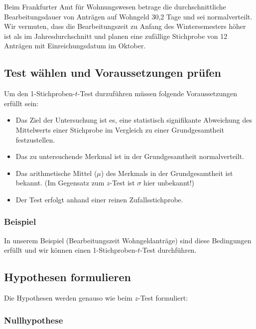 \documentclass[
  11pt,
  ngerman,
  a4paper,
]{report}
\providecommand{\tightlist}{%
  \setlength{\itemsep}{0pt}\setlength{\parskip}{0pt}}
\begin{document}
Beim Frankfurter Amt für Wohnungswesen betrage die durchschnittliche Bearbeitungsdauer von Anträgen auf Wohngeld 30,2 Tage und sei normalverteilt. Wir vermuten, dass die Bearbeitungszeit zu Anfang des Wintersemesters höher ist als im Jahresdurchschnitt und planen eine zufällige Stichprobe von 12 Anträgen mit Einreichungsdatum im Oktober.

\hypertarget{test-wuxe4hlen-und-voraussetzungen-pruxfcfen-1}{%
\subsection{Test wählen und Voraussetzungen prüfen}\label{test-wuxe4hlen-und-voraussetzungen-pruxfcfen-1}}

Um den 1-Stichproben-\(t\)-Test durzuführen müssen folgende Voraussetzungen erfüllt sein:

\begin{itemize}
\tightlist
\item
  Das Ziel der Untersuchung ist es, eine statistisch signifikante Abweichung des Mittelwerts einer Stichprobe im Vergleich zu einer Grundgesamtheit festzustellen.
\item
  Das zu untersuchende Merkmal ist in der Grundgesamtheit normalverteilt.
\item
  Das arithmetische Mittel (\(\mu\)) des Merkmals in der Grundgesamtheit ist bekannt. (Im Gegensatz zum \(z\)-Test ist \(\sigma\) hier unbekannt!)
\item
  Der Test erfolgt anhand einer reinen Zufallsstichprobe.
\end{itemize}

\hypertarget{beispiel-6}{%
\subsubsection{Beispiel}\label{beispiel-6}}

In unserem Beispiel (Bearbeitungszeit Wohngeldanträge) sind diese Bedingungen erfüllt und wir können einen 1-Stichproben-\(t\)-Test durchführen.

\hypertarget{hypothesen-formulieren-1}{%
\subsection{Hypothesen formulieren}\label{hypothesen-formulieren-1}}

Die Hypothesen werden genauso wie beim \(z\)-Test formuliert:

\hypertarget{nullhypothese-1}{%
\subsubsection{Nullhypothese}\label{nullhypothese-1}}
\end{document}
